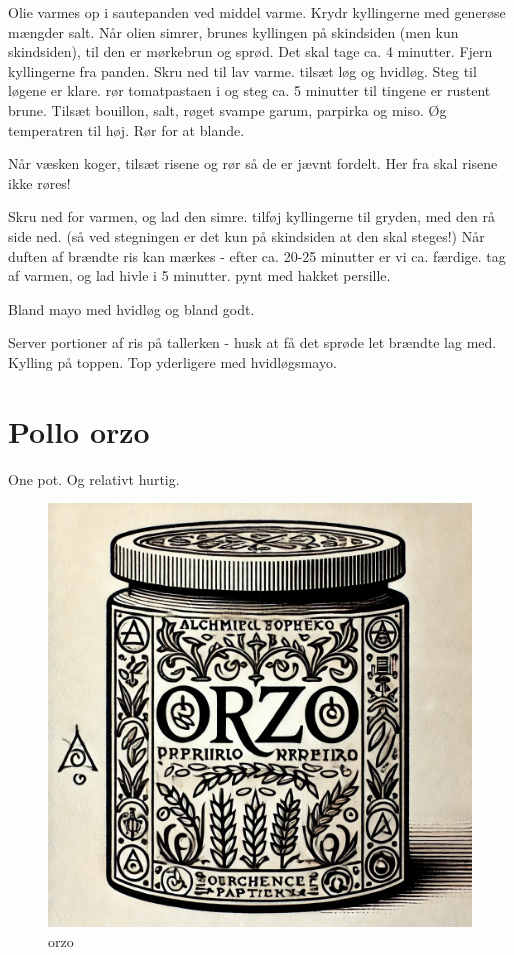\documentclass[
]{book}
\begin{document}
Olie varmes op i sautepanden ved middel varme. Krydr kyllingerne med generøse
mængder salt. Når olien simrer, brunes kyllingen på skindsiden (men kun skindsiden),
til den er mørkebrun og sprød. Det skal tage ca. 4 minutter.
Fjern kyllingerne fra panden. Skru ned til lav varme.
tilsæt løg og hvidløg. Steg til løgene er klare.
rør tomatpastaen i og steg ca. 5 minutter til tingene er rustent brune.
Tilsæt bouillon, salt, røget svampe garum, parpirka og miso. Øg temperatren til høj. Rør for at
blande.

Når væsken koger, tilsæt risene og rør så de er jævnt fordelt. Her fra skal risene ikke røres!

Skru ned for varmen, og lad den simre. tilføj kyllingerne til gryden, med den rå side ned. (så ved stegningen
er det kun på skindsiden at den skal steges!) Når duften af brændte ris kan mærkes - efter ca. 20-25 minutter
er vi ca. færdige. tag af varmen, og lad hivle i 5 minutter. pynt med hakket persille.

Bland mayo med hvidløg og bland godt.

Server portioner af ris på tallerken - husk at få det sprøde let brændte lag med. Kylling på toppen.
Top yderligere med hvidløgsmayo.

\hypertarget{pollo-orzo}{%
\section{Pollo orzo}\label{pollo-orzo}}

One pot. Og relativt hurtig.

\begin{figure}
\centering
\includegraphics{images/orzo.png}
\caption{orzo}
\end{figure}
\end{document}

